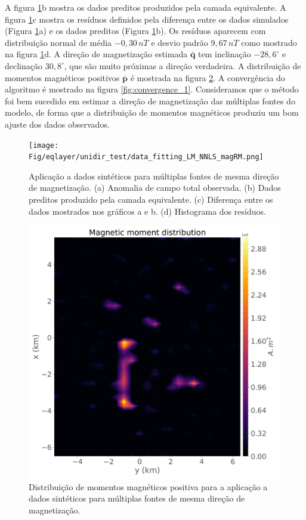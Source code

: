 A figura \ref{fig:data_fitting_1}b mostra os dados preditos produzidos pela camada equivalente. A figura \ref{fig:data_fitting_1}c mostra os resíduos definidos pela diferença entre os dados simulados (Figura \ref{fig:data_fitting_1}a) e os dados preditos (Figura \ref{fig:data_fitting_1}b). Os resíduos aparecem com distribuição normal de média $-0,30 \, nT$ e desvio padrão $9,67 \, nT$ como mostrado na figura \ref{fig:data_fitting_1}d. A direção de magnetização estimada $\bar{\mathbf{q}}$ tem inclinação $-28,6^\circ$ e declinação $30,8^\circ$, que são muito próximas a direção verdadeira. A distribuição de momentos magnéticos positivos $\bar{\mathbf{p}}$ é mostrada na figura \ref{fig:dist_momentos_pos_1}. A convergência do algoritmo é mostrado na figura \ref{fig:convergence_1}. Consideramos que o método foi bem sucedido em estimar a direção de magnetização das múltiplas fontes do modelo, de forma que a distribuição de momentos magnéticos produziu um bom ajuste dos dados observados. 

\begin{figure}
	\centering
	\texttt{[image: Fig/eqlayer/unidir\_test/data\_fitting\_LM\_NNLS\_magRM.png]}
	\caption{Aplicação a dados sintéticos para múltiplas fontes de mesma direção de magnetização. (a) Anomalia de campo total observada. (b) Dados preditos produzido pela camada equivalente. (c) Diferença entre os dados mostrados nos gráficos a e b. (d) Histograma dos resíduos.}
	\label{fig:data_fitting_1}
\end{figure}

\begin{figure}
	\centering
	\includegraphics[width=.9\textwidth]{Fig/eqlayer/unidir_test/magnetic_moment_positive_LM_NNLS_magRM.png}
	\caption{Distribuição de momentos magnéticos positiva para a aplicação a dados sintéticos para múltiplas fontes de mesma direção de magnetização.}
	\label{fig:dist_momentos_pos_1}
\end{figure}


